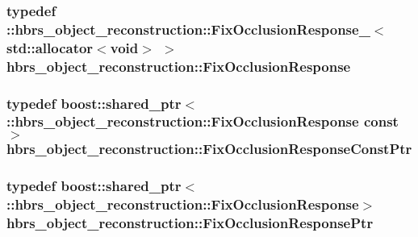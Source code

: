 \hypertarget{namespacehbrs__object__reconstruction_a62a6d8a132bcd4fdf13bb7af257264ed}{
\subsubsection[{\-Fix\-Occlusion\-Response}]{\setlength{\rightskip}{0pt plus 5cm}typedef \-::{\bf hbrs\-\_\-object\-\_\-reconstruction\-::\-Fix\-Occlusion\-Response\-\_\-}$<$std\-::allocator$<$void$>$ $>$ {\bf hbrs\-\_\-object\-\_\-reconstruction\-::\-Fix\-Occlusion\-Response}}}\label{namespacehbrs__object__reconstruction_a62a6d8a132bcd4fdf13bb7af257264ed}
\hypertarget{namespacehbrs__object__reconstruction_a58c7a787f7d1e9e3b9a447e8b4485ff2}{
\subsubsection[{\-Fix\-Occlusion\-Response\-Const\-Ptr}]{\setlength{\rightskip}{0pt plus 5cm}typedef boost\-::shared\-\_\-ptr$<$ \-::{\bf hbrs\-\_\-object\-\_\-reconstruction\-::\-Fix\-Occlusion\-Response} const$>$ {\bf hbrs\-\_\-object\-\_\-reconstruction\-::\-Fix\-Occlusion\-Response\-Const\-Ptr}}}\label{namespacehbrs__object__reconstruction_a58c7a787f7d1e9e3b9a447e8b4485ff2}
\hypertarget{namespacehbrs__object__reconstruction_a34f9a4dc2f3b6dad5d37372697e77c6f}{
\subsubsection[{\-Fix\-Occlusion\-Response\-Ptr}]{\setlength{\rightskip}{0pt plus 5cm}typedef boost\-::shared\-\_\-ptr$<$ \-::{\bf hbrs\-\_\-object\-\_\-reconstruction\-::\-Fix\-Occlusion\-Response}$>$ {\bf hbrs\-\_\-object\-\_\-reconstruction\-::\-Fix\-Occlusion\-Response\-Ptr}}}\label{namespacehbrs__object__reconstruction_a34f9a4dc2f3b6dad5d37372697e77c6f}
